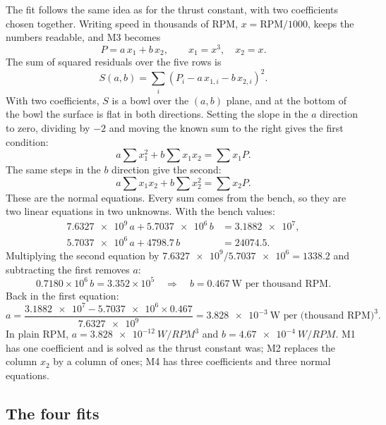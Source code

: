 The fit follows the same idea as for the thrust constant, with two coefficients chosen together. Writing speed in thousands of RPM, $x = \text{RPM}/1000$, keeps the numbers readable, and M3 becomes
\begin{equation}
P = a\,x_1 + b\,x_2, \qquad x_1 = x^3, \quad x_2 = x.
\end{equation}
The sum of squared residuals over the five rows is
\begin{equation}
S(a,b) = \sum_i \left(P_i - a\,x_{1,i} - b\,x_{2,i}\right)^2.
\end{equation}
With two coefficients, $S$ is a bowl over the $(a,b)$ plane, and at the bottom of the bowl the surface is flat in both directions. Setting the slope in the $a$ direction to zero, dividing by $-2$ and moving the known sum to the right gives the first condition:
\begin{equation}
a \sum x_1^2 + b \sum x_1 x_2 = \sum x_1 P.
\end{equation}
The same steps in the $b$ direction give the second:
\begin{equation}
a \sum x_1 x_2 + b \sum x_2^2 = \sum x_2 P.
\end{equation}
These are the normal equations. Every sum comes from the bench, so they are two linear equations in two unknowns. With the bench values:
\begin{align}
\num{7.6327e9}\, a + \num{5.7037e6}\, b &= \num{3.1882e7},\\
\num{5.7037e6}\, a + \num{4798.7}\, b &= \num{24074.5}.
\end{align}
Multiplying the second equation by $\num{7.6327e9}/\num{5.7037e6} = 1338.2$ and subtracting the first removes $a$:
\begin{equation}
0.7180\times10^{6}\, b = 3.352\times10^{5} \quad\Rightarrow\quad b = 0.467\ \text{W per thousand RPM}.
\end{equation}
Back in the first equation:
\begin{equation}
a = \frac{\num{3.1882e7} - \num{5.7037e6} \times 0.467}{\num{7.6327e9}} = \num{3.828e-3}\ \text{W per (thousand RPM)}^3.
\end{equation}
In plain RPM, $a = \SI{3.828e-12}{W/RPM^3}$ and $b = \SI{4.67e-4}{W/RPM}$. M1 has one coefficient and is solved as the thrust constant was; M2 replaces the column $x_2$ by a column of ones; M4 has three coefficients and three normal equations.

\subsection{The four fits}

